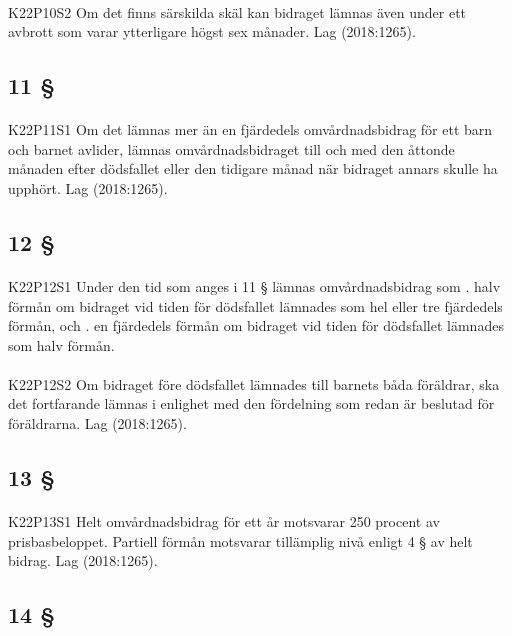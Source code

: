 \documentclass[a4paper,notitlepage,openany,10pt]{book}
\begin{document}
\paragraph*{}
{\tiny K22P10S2}
Om det finns särskilda skäl kan bidraget lämnas även under ett avbrott som varar ytterligare högst sex månader.
Lag (2018:1265).
\subsection*{11 §}
\paragraph*{}
{\tiny K22P11S1}
Om det lämnas mer än en fjärdedels omvårdnadsbidrag för ett barn och barnet avlider, lämnas omvårdnadsbidraget till och med den åttonde månaden efter dödsfallet eller den tidigare månad när bidraget annars skulle ha upphört.
Lag (2018:1265).
\subsection*{12 §}
\paragraph*{}
{\tiny K22P12S1}
Under den tid som anges i 11 § lämnas omvårdnadsbidrag som
. halv förmån om bidraget vid tiden för dödsfallet lämnades som hel eller tre fjärdedels förmån, och
. en fjärdedels förmån om bidraget vid tiden för dödsfallet lämnades som halv förmån.
\paragraph*{}
{\tiny K22P12S2}
Om bidraget före dödsfallet lämnades till barnets båda föräldrar, ska det fortfarande lämnas i enlighet med den fördelning som redan är beslutad för föräldrarna.
Lag (2018:1265).
\subsection*{13 §}
\paragraph*{}
{\tiny K22P13S1}
Helt omvårdnadsbidrag för ett år motsvarar 250 procent av prisbasbeloppet. Partiell förmån motsvarar tillämplig nivå enligt 4 § av helt bidrag.
Lag (2018:1265).
\subsection*{14 §}
\end{document}
